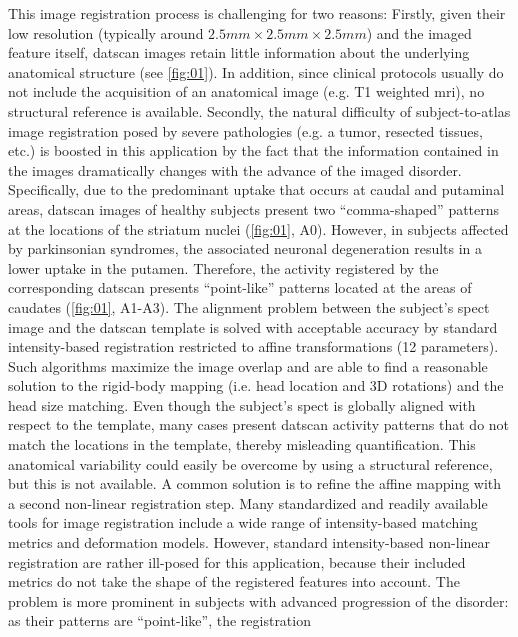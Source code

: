 \documentclass{frontiers}
\begin{document}
This image registration process is challenging for two reasons:
Firstly, given their low resolution  (typically around $2.5mm\times2.5mm\times2.5mm$)
  and the imaged feature itself, \gls*{datscan} images retain little information about the
  underlying anatomical structure  (see \autoref{fig:01}). 
In addition, since clinical protocols usually do not include the acquisition
  of an anatomical image (e.g. T1 weighted \gls*{mri}), 
  no structural reference is available.
Secondly, the natural difficulty of subject-to-atlas image registration
  posed by severe pathologies (e.g. a tumor, resected tissues, etc.) 
  is boosted in this application by the fact that the information 
  contained in the images dramatically changes with the advance of
  the imaged disorder.
Specifically, due to the predominant uptake that occurs at caudal and putaminal areas,
  \gls*{datscan} images of healthy subjects present two
  ``comma-shaped'' patterns at the locations of the striatum nuclei
  (\autoref{fig:01}, A0).
  However, in subjects affected by parkinsonian syndromes, the associated
  neuronal degeneration results in a lower uptake in the putamen.
Therefore, the activity registered by the corresponding \gls*{datscan} presents
  ``point-like'' patterns located at the areas of caudates (\autoref{fig:01}, A1-A3).
The alignment problem between the subject's \gls*{spect} image and the
  \gls*{datscan} template is solved with acceptable accuracy by standard
  intensity-based registration restricted to affine transformations (12 parameters).
Such algorithms maximize the image overlap and are able to find a reasonable solution
  to the rigid-body mapping (i.e. head location and 3D rotations) and the head size matching.
Even though the subject's \gls*{spect} is globally aligned with respect to the
  template, many cases present \gls*{datscan} activity patterns that do
  not match the locations in the template, thereby misleading quantification.
This anatomical variability could easily be overcome by using a structural
  reference, but this is not available.
A common solution is to refine the affine mapping with a second
  non-linear registration step. 
Many standardized and readily available tools for image registration include a wide range 
  of intensity-based matching metrics  and deformation models.
However, standard intensity-based non-linear registration are rather ill-posed for 
  this application, because their included metrics do not take the shape of the registered
  features into account. 
The problem is more prominent in subjects with advanced progression of
  the disorder: as their patterns are ``point-like'', the registration
\end{document}
